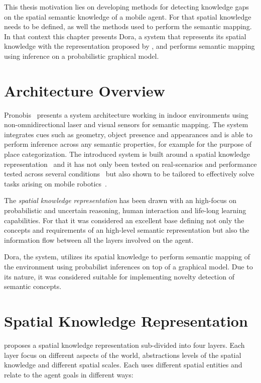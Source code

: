 This thesis motivation lies on developing methods for detecting knowledge gaps on the spatial
semantic knowledge of a mobile agent. For that spatial knowledge needs to be defined, as well
the methods used to perform the semantic mapping.
In that context this chapter presents \gls{Dora}, a system that represents its spatial knowledge
with the representation proposed by \cite{pronobis2010ias}, and performs semantic mapping using
inference on a probabilistic graphical model.


\section{Architecture Overview}
Pronobis~\cite{pronobis2011phd} presents a system architecture working in indoor environments using
non\hyp{}omnidirectional laser and visual sensors for semantic mapping. The system integrates cues such as geometry,
object presence and appearances and is able to perform inference across any semantic properties,
for example for the purpose of place categorization.
The introduced system is built around a spatial knowledge representation~\cite{pronobis2010ias} and it has not only been tested on real-scenarios
and performance tested across several conditions~\cite{pronobis2007iros} but also shown
to be tailored to effectively solve tasks arising on mobile robotics~\cite{hanheide2011ijcai}.

The \emph{spatial knowledge representation} has been drawn with an high-focus on probabilistic
and uncertain reasoning, human interaction and life-long learning capabilities.
For that it was considered an excellent base defining not only the concepts and
requirements of an high-level semantic representation but also the information flow
between all the layers involved on the agent.

\gls{Dora}, the system, utilizes its spatial knowledge to perform semantic mapping of the environment
using probabilist inferences on top of a graphical model.
Due to its nature, it was considered suitable for implementing novelty detection of semantic concepts.

\section{Spatial Knowledge Representation}
\cite{pronobis2010ias} proposes a spatial knowledge representation sub-divided into four layers.
Each layer focus on different aspects of the world, abstractions levels of the spatial knowledge
and different spatial scales. Each uses different spatial entities and relate to the agent
goals in different ways:

